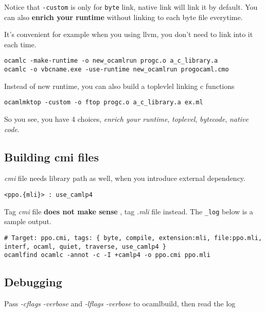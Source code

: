 \documentclass[11pt]{article}
\begin{document}
    Notice that \texttt{-custom} is only for \texttt{byte} link, native link
    will link it by default. You can also \textbf{enrich your runtime}
    without linking to each byte file everytime.

    It's convenient for example when you using llvm, you don't need to
    link into it each time.


\begin{verbatim}
ocamlc -make-runtime -o new_ocamlrun progc.o a_c_library.a
ocamlc -o vbcname.exe -use-runtime new_ocamlrun progocaml.cmo
\end{verbatim}


    Instead of new runtime, you can also build a toplevlel linking c
    functions


\begin{verbatim}
ocamlmktop -custom -o ftop progc.o a_c_library.a ex.ml
\end{verbatim}

    So you see, you have 4 choices, \emph{enrich your runtime}, \emph{toplevel},
    \emph{bytecode}, \emph{native code}.
\subsection*{Building cmi files}
\label{sec-1-14}

   \emph{cmi} file needs library path as well, when you introduce
   external dependency.


\begin{verbatim}
<ppo.{mli}> : use_camlp4
\end{verbatim}

   Tag \emph{cmi} file \textbf{does not make sense} , tag \emph{.mli} file instead.
   The \texttt{\_log} below is a sample output.


\begin{verbatim}
# Target: ppo.cmi, tags: { byte, compile, extension:mli, file:ppo.mli, interf, ocaml, quiet, traverse, use_camlp4 }
ocamlfind ocamlc -annot -c -I +camlp4 -o ppo.cmi ppo.mli
\end{verbatim}
\subsection*{Debugging}
\label{sec-1-15}

   Pass \emph{-cflags -verbose} and \emph{-lflags -verbose} to
   ocamlbuild, then read the log
\end{document}
